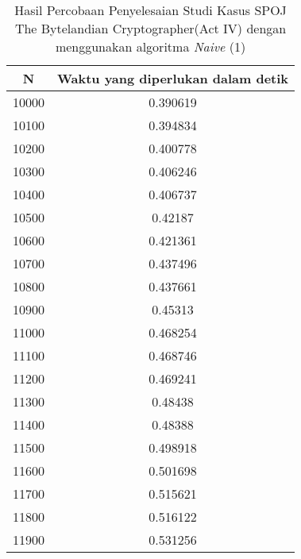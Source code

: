 \begin{table}[H]
\centering
\begin{tabular}{|c|c|}\hline
N&Waktu yang diperlukan dalam detik\\ \hline
10000&0.390619\\ \hline
10100&0.394834\\ \hline
10200&0.400778\\ \hline
10300&0.406246\\ \hline
10400&0.406737\\ \hline
10500&0.42187\\ \hline
10600&0.421361\\ \hline
10700&0.437496\\ \hline
10800&0.437661\\ \hline
10900&0.45313\\ \hline
11000&0.468254\\ \hline
11100&0.468746\\ \hline
11200&0.469241\\ \hline
11300&0.48438\\ \hline
11400&0.48388\\ \hline
11500&0.498918\\ \hline
11600&0.501698\\ \hline
11700&0.515621\\ \hline
11800&0.516122\\ \hline
11900&0.531256\\ \hline
\end{tabular}
\caption {Hasil Percobaan Penyelesaian Studi Kasus SPOJ The Bytelandian Cryptographer(Act IV) dengan menggunakan algoritma \textit{Naive} (1)}
\label{tab:1res2}
\end{table}
